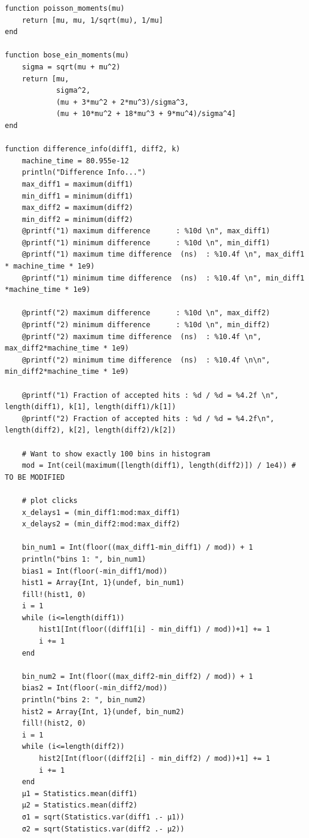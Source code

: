 \documentclass[10pt, final]{article}
\begin{document}
\begin{mdframed}
\begin{lstlisting}
function poisson_moments(mu)
    return [mu, mu, 1/sqrt(mu), 1/mu]
end

function bose_ein_moments(mu)
    sigma = sqrt(mu + mu^2)
    return [mu,
            sigma^2,
            (mu + 3*mu^2 + 2*mu^3)/sigma^3,
            (mu + 10*mu^2 + 18*mu^3 + 9*mu^4)/sigma^4]
end

function difference_info(diff1, diff2, k)
    machine_time = 80.955e-12
    println("Difference Info...")
    max_diff1 = maximum(diff1)
    min_diff1 = minimum(diff1)
    max_diff2 = maximum(diff2)
    min_diff2 = minimum(diff2)
    @printf("1) maximum difference      : %10d \n", max_diff1)
    @printf("1) minimum difference      : %10d \n", min_diff1)
    @printf("1) maximum time difference  (ns)  : %10.4f \n", max_diff1 * machine_time * 1e9)
    @printf("1) minimum time difference  (ns)  : %10.4f \n", min_diff1 *machine_time * 1e9)

    @printf("2) maximum difference      : %10d \n", max_diff2)
    @printf("2) minimum difference      : %10d \n", min_diff2)
    @printf("2) maximum time difference  (ns)  : %10.4f \n", max_diff2*machine_time * 1e9)
    @printf("2) minimum time difference  (ns)  : %10.4f \n\n", min_diff2*machine_time * 1e9)

    @printf("1) Fraction of accepted hits : %d / %d = %4.2f \n", length(diff1), k[1], length(diff1)/k[1])
    @printf("2) Fraction of accepted hits : %d / %d = %4.2f\n", length(diff2), k[2], length(diff2)/k[2])

    # Want to show exactly 100 bins in histogram
    mod = Int(ceil(maximum([length(diff1), length(diff2)]) / 1e4)) # TO BE MODIFIED

    # plot clicks 
    x_delays1 = (min_diff1:mod:max_diff1)
    x_delays2 = (min_diff2:mod:max_diff2)

    bin_num1 = Int(floor((max_diff1-min_diff1) / mod)) + 1
    println("bins 1: ", bin_num1)
    bias1 = Int(floor(-min_diff1/mod))
    hist1 = Array{Int, 1}(undef, bin_num1)
    fill!(hist1, 0)
    i = 1
    while (i<=length(diff1))
        hist1[Int(floor((diff1[i] - min_diff1) / mod))+1] += 1
        i += 1
    end

    bin_num2 = Int(floor((max_diff2-min_diff2) / mod)) + 1
    bias2 = Int(floor(-min_diff2/mod))
    println("bins 2: ", bin_num2)
    hist2 = Array{Int, 1}(undef, bin_num2)
    fill!(hist2, 0)
    i = 1
    while (i<=length(diff2))
        hist2[Int(floor((diff2[i] - min_diff2) / mod))+1] += 1
        i += 1
    end
    μ1 = Statistics.mean(diff1)
    μ2 = Statistics.mean(diff2)
    σ1 = sqrt(Statistics.var(diff1 .- μ1))
    σ2 = sqrt(Statistics.var(diff2 .- μ2)) 


\end{lstlisting}
\end{mdframed}
\end{document}
